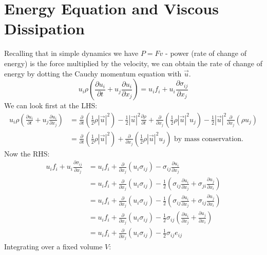 \documentclass[../Main.tex]{subfiles}
\begin{document}
\section{Energy Equation and Viscous Dissipation}
Recalling that in simple dynamics we have $P = Fv$ - power (rate of change of energy) is the force multiplied by the velocity, we can obtain the rate of change of energy by dotting the Cauchy momentum equation with $\vec{u}$.
\begin{equation*}
    u_i \rho \left(\frac{\partial u_i}{\partial t} + u_j \frac{\partial u_i}{\partial x_j}\right) = u_i f_i + u_i \frac{\partial \sigma_{ij}}{\partial x_j}
\end{equation*}
We can look first at the LHS:
\begin{align*}
    u_i \rho \left(\frac{\partial u_i}{\partial t} + u_j \frac{\partial u_i}{\partial x_j}\right) &= \frac{\partial}{\partial t} \left(\frac12 \rho |\vec{u}|^2\right) - \frac12 |\vec{u}|^2 \frac{\partial \rho}{\partial t} + \frac{\partial}{\partial x_j} \left(\frac12 \rho |\vec{u}|^2 u_j\right) - \frac12 |\vec{u}|^2 \frac{\partial}{\partial x_j} \left(\rho u_j\right) \\
    &= \frac{\partial}{\partial t} \left(\frac12 \rho |\vec{u}|^2\right) + \frac{\partial}{\partial x_j} \left(\frac12 \rho |\vec{u}|^2 u_j\right) \text{ by mass conservation}.
\end{align*}
Now the RHS:
\begin{align*}
    u_i f_i + u_i \frac{\partial \sigma_{ij}}{\partial x_j} &= u_i f_i + \frac{\partial}{\partial x_j}\left(u_i \sigma_{ij}\right) - \sigma_{ij} \frac{\partial u_i}{\partial x_j} \\
    &= u_i f_i + \frac{\partial}{\partial x_j}\left(u_i \sigma_{ij}\right) - \frac12\left(\sigma_{ij} \frac{\partial u_i}{\partial x_j} + \sigma_{ji} \frac{\partial u_j}{\partial x_i}\right) \\
    &= u_i f_i + \frac{\partial}{\partial x_j}\left(u_i \sigma_{ij}\right) - \frac12\left(\sigma_{ij} \frac{\partial u_i}{\partial x_j} + \sigma_{ij} \frac{\partial u_j}{\partial x_i}\right) \\
    &= u_i f_i + \frac{\partial}{\partial x_j}\left(u_i \sigma_{ij}\right) - \frac12\sigma_{ij}\left(\frac{\partial u_i}{\partial x_j} + \frac{\partial u_j}{\partial x_i}\right) \\
    &= u_i f_i + \frac{\partial}{\partial x_j}\left(u_i \sigma_{ij}\right) - \frac12\sigma_{ij} e_{ij}
\end{align*}
Integrating over a fixed volume $V$:
\end{document}

